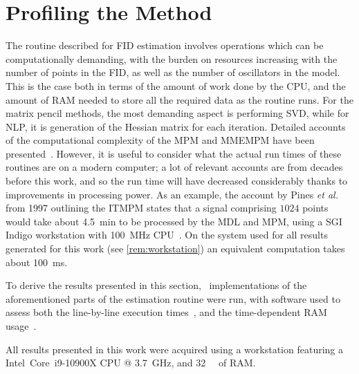 \section{Profiling the Method}
\label{sec:profiling}
The routine described for \ac{FID} estimation involves operations which can be
computationally demanding, with the burden on resources
increasing with the number of points in the \ac{FID}, as well as the number of
oscillators in the model. This is the case both in terms of the amount of work
done by the \ac{CPU}, and the amount of \ac{RAM} needed to store all the
required data as the routine runs. For the matrix pencil methods, the most
demanding aspect is performing \ac{SVD}, while for \ac{NLP}, it
is generation of the Hessian matrix for each iteration. Detailed accounts of the
computational complexity of the \ac{MPM} and \ac{MMEMPM} have been
presented~\cite{Hua1992,Chen2007}.  However, it is useful to consider what the
actual run times of these routines are on a modern computer; a lot of relevant
accounts are from decades before this work, and so the
run time will have decreased considerably thanks to
improvements in processing power. As an example, the account by Pines \emph{et al.}
from 1997 outlining the \ac{ITMPM} states that a signal comprising
$1024$ points would take about
\qty{4.5}{\minute} to be processed by the \ac{MDL} and \ac{MPM}, using a
SGI Indigo workstation with \qty{100}{\mega\hertz} \ac{CPU}~\cite{Lin1997}. On
the system used for all results generated for this work (see
\cref{rem:workstation}) an equivalent computation takes about
\qty{100}{\milli\second}.
\label{corr:pines-ram}

To derive the results presented in this section, \Python\ implementations of
the aforementioned parts of the estimation routine were run, with software used
to assess both the line-by-line execution times~\cite{LineProf}, and the
time-dependent \ac{RAM} usage~\cite{MemProf}.
\begin{remark}
    \label{rem:workstation}
    All results presented in this work were acquired using a workstation
    featuring a Intel\textregistered\ Core\texttrademark\ i9-10900X \ac{CPU} @
    \qty{3.7}{\giga\hertz}, and \qty{32}{\gibi\byte} of \ac{RAM}.
\end{remark}

